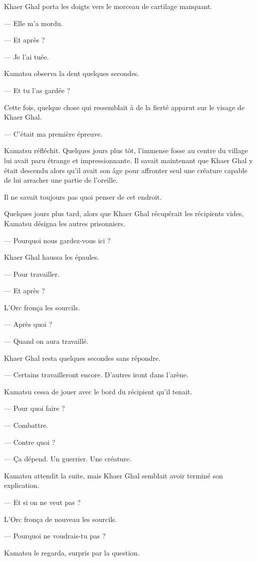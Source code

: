 Khaer Ghal porta les doigts vers le morceau de cartilage manquant.

— Elle m'a mordu.

— Et après ?

— Je l'ai tuée.

Kamatsu observa la dent quelques secondes.

— Et tu l'as gardée ?

Cette fois, quelque chose qui ressemblait à de la fierté apparut sur le visage
de Khaer Ghal.

— C'était ma première épreuve.

Kamatsu réfléchit. Quelques jours plus tôt, l'immense fosse au centre du
village lui avait paru étrange et impressionnante. Il savait maintenant que
Khaer Ghal y était descendu alors qu'il avait son âge pour affronter seul une
créature capable de lui arracher une partie de l'oreille.

Il ne savait toujours pas quoi penser de cet endroit.

Quelques jours plus tard, alors que Khaer Ghal récupérait les récipients vides,
Kamatsu désigna les autres prisonniers.

— Pourquoi nous gardez-vous ici ?

Khaer Ghal haussa les épaules.

— Pour travailler.

— Et après ?

L'Orc fronça les sourcils.

— Après quoi ?

— Quand on aura travaillé.

Khaer Ghal resta quelques secondes sans répondre.

— Certains travailleront encore. D'autres iront dans l'arène.

Kamatsu cessa de jouer avec le bord du récipient qu'il tenait.

— Pour quoi faire ?

— Combattre.

— Contre quoi ?

— Ça dépend. Un guerrier. Une créature.

Kamatsu attendit la suite, mais Khaer Ghal semblait avoir terminé son
explication.

— Et si on ne veut pas ?

L'Orc fronça de nouveau les sourcils.

— Pourquoi ne voudrais-tu pas ?

Kamatsu le regarda, surpris par la question.

